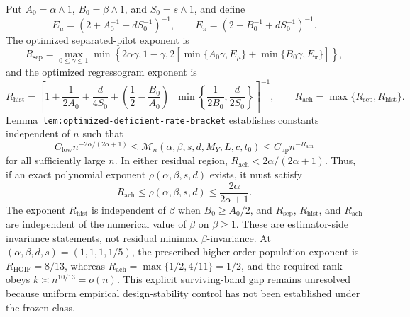 Put \(A_0=\alpha\wedge1\), \(B_0=\beta\wedge1\), and \(S_0=s\wedge1\), and define
\[
E_\mu=\left(2+A_0^{-1}+dS_0^{-1}\right)^{-1},
\qquad
E_\pi=\left(2+B_0^{-1}+dS_0^{-1}\right)^{-1}.
\]
The optimized separated-pilot exponent is
\[
R_{\mathrm{sep}}=
\max_{0\le\gamma\le1}
\min\left\{
2\alpha\gamma,
1-\gamma,
2\left[\min\{A_0\gamma,E_\mu\}+\min\{B_0\gamma,E_\pi\}\right]
\right\},
\]
and the optimized regressogram exponent is
\[
R_{\mathrm{hist}}=
\left[
1+\frac1{2A_0}+\frac d{4S_0}
+\left(\frac12-\frac{B_0}{A_0}\right)_+
\min\left\{\frac1{2B_0},\frac d{2S_0}\right\}
\right]^{-1},
\qquad
R_{\mathrm{ach}}=\max\{R_{\mathrm{sep}},R_{\mathrm{hist}}\}.
\]
Lemma~\texttt{lem:optimized-deficient-rate-bracket} establishes constants independent of \(n\) such that
\[
C_{\mathrm{low}}n^{-2\alpha/(2\alpha+1)}
\le
\mathcal M_n(\alpha,\beta,s,d,M_Y,L,c,t_0)
\le
C_{\mathrm{up}}n^{-R_{\mathrm{ach}}}
\]
for all sufficiently large \(n\). In either residual region, \(R_{\mathrm{ach}}<2\alpha/(2\alpha+1)\). Thus, if an exact polynomial exponent \(\rho(\alpha,\beta,s,d)\) exists, it must satisfy
\[
R_{\mathrm{ach}}\le\rho(\alpha,\beta,s,d)
\le\frac{2\alpha}{2\alpha+1}.
\]
The exponent \(R_{\mathrm{hist}}\) is independent of \(\beta\) when \(B_0\ge A_0/2\), and \(R_{\mathrm{sep}}\), \(R_{\mathrm{hist}}\), and \(R_{\mathrm{ach}}\) are independent of the numerical value of \(\beta\) on \(\beta\ge1\). These are estimator-side invariance statements, not residual minimax \(\beta\)-invariance. At \((\alpha,\beta,d,s)=(1,1,1,1/5)\), the prescribed higher-order population exponent is \(R_{\mathrm{HOIF}}=8/13\), whereas \(R_{\mathrm{ach}}=\max\{1/2,4/11\}=1/2\), and the required rank obeys \(k\asymp n^{10/13}=o(n)\). This explicit surviving-band gap remains unresolved because uniform empirical design-stability control has not been established under the frozen class.